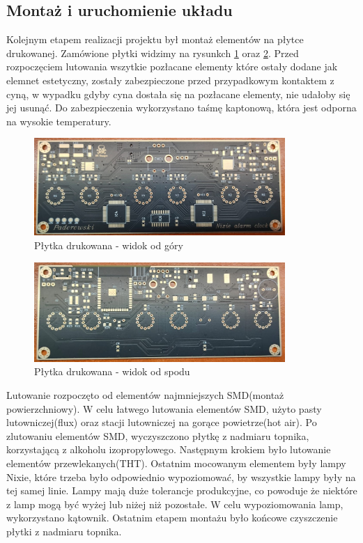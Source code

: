 \documentclass[../main.tex]{subfiles}
\begin{document}
\subsection{Montaż i uruchomienie układu}
Kolejnym etapem realizacji projektu był montaż elementów na płytce drukowanej. Zamówione płytki widzimy na rysunkch \ref{fig:plytka_drukowana_1} oraz \ref{fig:plytka_drukowana_2}.
Przed rozpoczęciem lutowania wszytkie pozłacane elementy
które ostały dodane jak elemnet estetyczny, zostały zabezpieczone przed przypadkowym kontaktem z cyną, w wypadku gdyby cyna dostała się
na pozłacane elementy, nie udałoby się jej usunąć. Do zabezpieczenia wykorzystano taśmę kaptonową, która jest odporna na wysokie temperatury.

\begin{figure}[H]
    \centering
    \includegraphics[width=0.85\textwidth]{przod.jpeg}
    \caption{Płytka drukowana - widok od góry}
    \label{fig:plytka_drukowana_1}
\end{figure}

\begin{figure}[H]
    \centering
    \includegraphics[width=0.85\textwidth]{tyl.jpeg}
    \caption{Płytka drukowana - widok od spodu}
    \label{fig:plytka_drukowana_2}
\end{figure}


Lutowanie rozpoczęto od elementów najmniejszych SMD(montaż powierzchniowy). W celu łatwego lutowania elementów SMD, użyto pasty lutowniczej(flux)
oraz stacji lutowniczej na gorące powietrze(hot air). Po zlutowaniu elementów SMD, wyczyszczono płytkę z nadmiaru topnika, korzystającą z alkoholu izopropylowego. Następnym
krokiem było lutowanie elementów przewlekanych(THT). Ostatnim  mocowanym elementem były lampy Nixie, które trzeba było odpowiednio wypoziomować, by wszystkie lampy
były na tej samej linie. Lampy mają duże tolerancje produkcyjne, co powoduje że niektóre z lamp mogą być wyżej lub niżej niż pozostałe. W celu wypoziomowania lamp,
wykorzystano kątownik. Ostatnim etapem montażu było końcowe czyszczenie płytki z nadmiaru topnika. 
\end{document}
